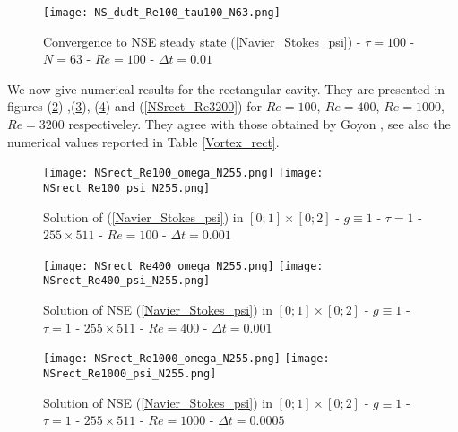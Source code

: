 \documentclass[11pt]{article}
\begin{document}
{\begin{figure}[!h]
\begin{center}
\texttt{[image: NS\_dudt\_Re100\_tau100\_N63.png]}
\caption{Convergence to NSE steady state (\ref{Navier_Stokes_psi}) - $\tau = 100$ -  $N=63$ - $Re = 100$ - $\Delta t = 0.01$}
\label{NS_dudt_Re100_tau100_N63}
\end{center}
\end{figure}



We now give numerical results for the rectangular cavity. They are presented in figures  (\ref{NSrect_Re100}) ,(\ref{NSrect_Re400}), (\ref{NSrect_Re1000}) and (\ref{NSrect_Re3200}) for $Re=100, \ Re=400$, $Re=1000$, $Re=3200$ respectiveley. They agree with those obtained by Goyon \cite{Goyon}, see also the numerical values reported in Table \ref{Vortex_rect}.

\begin{figure}[!h]
\begin{center}
\texttt{[image: NSrect\_Re100\_omega\_N255.png]}
\texttt{[image: NSrect\_Re100\_psi\_N255.png]}\\
\caption{Solution of (\ref{Navier_Stokes_psi}) in $[0; 1] \times [0; 2]$ - $g \equiv 1$ - $\tau = 1$ -  $255 \times 511$ - $Re = 100$ - $\Delta t = 0.001$}
\label{NSrect_Re100}
\end{center}
\end{figure}

\begin{figure}[!h]
\begin{center}
\texttt{[image: NSrect\_Re400\_omega\_N255.png]}
\texttt{[image: NSrect\_Re400\_psi\_N255.png]}\\
\caption{Solution of NSE (\ref{Navier_Stokes_psi}) in $[0; 1] \times [0; 2]$ - $g \equiv 1$ - $\tau = 1$ -  $255 \times 511$ - $Re = 400$ - $\Delta t = 0.001$}
\label{NSrect_Re400}
\end{center}
\end{figure}

\begin{figure}[!h]
\begin{center}
\texttt{[image: NSrect\_Re1000\_omega\_N255.png]}
\texttt{[image: NSrect\_Re1000\_psi\_N255.png]}\\
\caption{Solution of NSE (\ref{Navier_Stokes_psi}) in $[0; 1] \times [0; 2]$ - $g \equiv 1$ - $\tau = 1$ -  $255 \times 511$ - $Re = 1000$ - $\Delta t = 0.0005$}
\label{NSrect_Re1000}
\end{center}
\end{figure}




}
\end{document}

